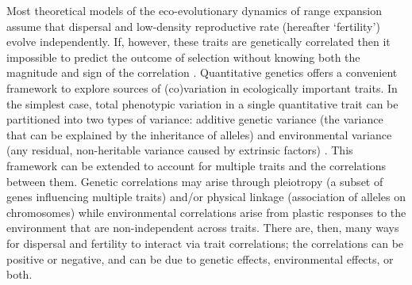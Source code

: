 \documentclass[11pt]{article}
\begin{document}
Most theoretical models of the eco-evolutionary dynamics of range expansion assume that dispersal and low-density reproductive rate (hereafter `fertility') evolve independently.
If, however, these traits are genetically correlated then it impossible to predict the outcome of selection without knowing both the magnitude and sign of the correlation \citep{lande_measurement_1983,chenoweth2010contribution}.
Quantitative genetics offers a convenient framework to explore sources of (co)variation in ecologically important traits.
In the simplest case, total phenotypic variation in a single quantitative trait can be partitioned into two types of variance: additive genetic variance (the variance that can be explained by the inheritance of alleles) and environmental variance (any residual, non-heritable variance caused by extrinsic factors) \citep{lynch_genetics_1998,kruuk_estimating_2004,wilson_ecologists_2010}.
This framework can be extended to account for multiple traits and the correlations between them.
Genetic correlations may arise through pleiotropy (a subset of genes influencing multiple traits) and/or physical linkage (association of alleles on chromosomes) \citep{roff_evolutionary_1997} while environmental correlations arise from plastic responses to the environment that are non-independent across traits.
There are, then, many ways for dispersal and fertility to interact via trait correlations; the correlations can be positive or negative, and can be due to genetic effects, environmental effects, or both.
\end{document}

